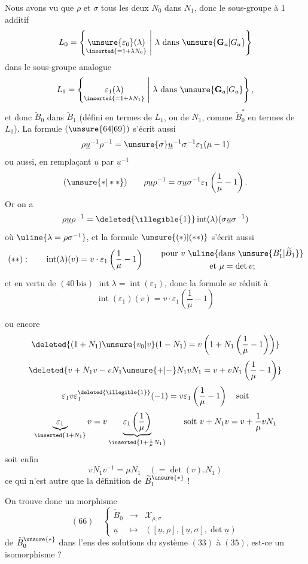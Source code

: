 Nous avons vu que $\rho$ et $\sigma$ tous les deux  $N_0$ dans $N_1$, donc le sous-groupe à $1$  additif
\[
L_0=\left\{\underset{\inserted{=1+\lambda N_0}}{\unsure{\varepsilon_0}(\lambda)}\ \middle|\ \lambda\text{ dans }\unsure{\mathbf G_a|G_a}\right\}
\]
dans le sous-groupe analogue
\[
L_1=\left\{\underset{\inserted{=1+\lambda N_1}}{\varepsilon_1(\lambda)}\ \middle|\ \lambda\text{ dans }\unsure{\mathbf G_a|G_a}\right\},
\]
et donc $\widetilde B_0$ dans $\widetilde B_1$ (défini en termes de $L_1$, ou de $N_1$, comme $\widetilde B_0^*$ en termes de $L_0$).  La formule $(\unsure{64|69})$ s'écrit aussi
\[
\rho\underline u^{-1}\rho^{-1}=\unsure{\sigma}\underline u^{-1}\sigma^{-1}\varepsilon_1(\mu-1)
\]
ou aussi, en remplaçant $\underline u$ par $\underline u^{-1}$
\[
(\unsure{*|**})\qquad
\rho\underline u\rho^{-1}=\sigma\underline u\sigma^{-1}\varepsilon_1\left(\frac1\mu-1\right).
\]
Or on  a
\[
\rho\underline u\rho^{-1}=\deleted{\illegible{1}}\operatorname{int}(\lambda)(\sigma\underline u\sigma^{-1})
\]
où $\uline{\lambda=\rho\sigma^{-1}}$, et la formule $\unsure{(*)|(**)}$ s'écrit aussi
\[
(**):\qquad
\operatorname{int}(\lambda)(v)=v\cdot\varepsilon_1\left(\frac1\mu-1\right)
\qquad\begin{gathered}
\text{pour }v\ \uline{\text{dans }\unsure{B'_1|\widetilde B_1}}\\
\text{et }\mu=\det v;
\end{gathered}
\]
et en vertu de $(40\ \mathrm{bis})$ $\operatorname{int}\lambda=\operatorname{int}(\varepsilon_1)$, donc la formule se réduit à
\[
\operatorname{int}(\varepsilon_1)(v)=v\cdot\varepsilon_1\left(\frac1\mu-1\right)
\]



ou encore
\[
\deleted{(1+N_1)\unsure{v_0|v}(1-N_1)=v\left(1+N_1\left(\frac1\mu-1\right)\right)}
\]
\[
\deleted{v+N_1v-vN_1\unsure{+|-}N_1vN_1=v+vN_1\left(\frac1\mu-1\right)}
\]
\[
\varepsilon_1v\varepsilon_1^{\deleted{\illegible{1}}}(-1)=v\varepsilon_1\left(\frac1\mu-1\right)\quad\text{soit}
\]
\[
\underbrace{\varepsilon_1}_{\inserted{1+N_1}}v
=v\underbrace{\varepsilon_1\left(\frac1\mu\right)}_{\inserted{1+\frac1\mu N_1}}
\qquad\text{soit }v+N_1v=v+\frac1\mu vN_1
\]
soit enfin
\[
vN_1v^{-1}=\mu N_1\quad(=\det(v).N_1)
\]
ce qui n'est autre que la définition de $\widetilde B_1^{\unsure{*}}$ !

On trouve donc un morphisme
\[
(66)\quad\left\{\begin{array}{rcl}
\widetilde B_0&\longrightarrow&\mathcal X_{\rho,\sigma}\\
\underline u&\longmapsto&([\underline u,\rho],[\underline u,\sigma],\det\underline u)
\end{array}\right.
\]
de $\widetilde B_0^{\unsure{*}}$ dans l'ens des solutions du système $(33)$ à $(35)$, est-ce un isomorphisme ?

